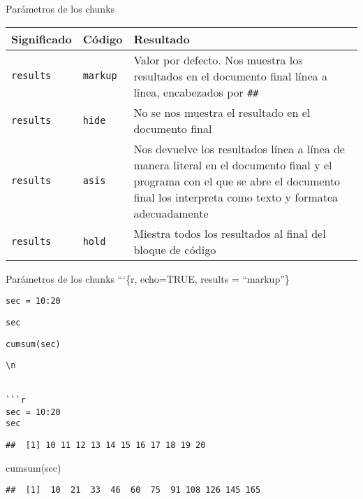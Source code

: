 \documentclass[
  ignorenonframetext,
]{beamer}
\newenvironment{Shaded}{\begin{snugshade}}{\end{snugshade}}
\newcommand{\FunctionTok}[1]{\textcolor[rgb]{0.00,0.00,0.00}{#1}}
\newcommand{\NormalTok}[1]{#1}
\begin{document}
\begin{frame}[fragile]{Parámetros de los chunks}
\protect\hypertarget{paruxe1metros-de-los-chunks-1}{}
\begin{longtable}[]{@{}
  >{\raggedright\arraybackslash}p{}
  >{\raggedright\arraybackslash}p{}
  >{\raggedright\arraybackslash}p{}@{}}
\toprule
Significado & Código & Resultado \\
\midrule
\endhead
\texttt{results} & \texttt{markup} & Valor por defecto. Nos muestra los
resultados en el documento final línea a línea, encabezados por
\texttt{\#\#} \\
\texttt{results} & \texttt{hide} & No se nos muestra el resultado en el
documento final \\
\texttt{results} & \texttt{asis} & Nos devuelve los resultados línea a
línea de manera literal en el documento final y el programa con el que
se abre el documento final los interpreta como texto y formatea
adecuadamente \\
\texttt{results} & \texttt{hold} & Miestra todos los resultados al final
del bloque de código \\
\bottomrule
\end{longtable}
\end{frame}

\begin{frame}[fragile]{Parámetros de los chunks}
\protect\hypertarget{paruxe1metros-de-los-chunks-2}{}
```\{r, echo=TRUE, results = ``markup''\}

\texttt{sec\ =\ 10:20}

\texttt{sec}

\texttt{cumsum(sec)}

\begin{verbatim}
\n


```r
sec = 10:20
sec
\end{verbatim}

\begin{verbatim}
##  [1] 10 11 12 13 14 15 16 17 18 19 20
\end{verbatim}

\begin{Shaded}
\begin{Highlighting}[]
\FunctionTok{cumsum}\NormalTok{(sec)}
\end{Highlighting}
\end{Shaded}

\begin{verbatim}
##  [1]  10  21  33  46  60  75  91 108 126 145 165
\end{verbatim}
\end{frame}
\end{document}
